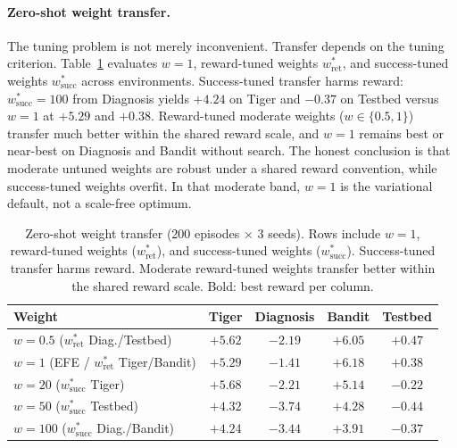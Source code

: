 \documentclass[runningheads]{llncs}
\begin{document}
\paragraph{Zero-shot weight transfer.}
The tuning problem is not merely inconvenient. Transfer depends on the tuning criterion. Table~\ref{tab:transfer} evaluates $w{=}1$, reward-tuned weights $w^*_{\mathrm{ret}}$, and success-tuned weights $w^*_{\mathrm{succ}}$ across environments. Success-tuned transfer harms reward: $w^*_{\mathrm{succ}}{=}100$ from Diagnosis yields $+4.24$ on Tiger and $-0.37$ on Testbed versus $w{=}1$ at $+5.29$ and $+0.38$. Reward-tuned moderate weights ($w\in\{0.5,1\}$) transfer much better within the shared reward scale, and $w{=}1$ remains best or near-best on Diagnosis and Bandit without search. The honest conclusion is that moderate untuned weights are robust under a shared reward convention, while success-tuned weights overfit. In that moderate band, $w{=}1$ is the variational default, not a scale-free optimum.

\begin{table}[ht]
\centering
\caption{Zero-shot weight transfer (200 episodes $\times$ 3 seeds). Rows include $w{=}1$, reward-tuned weights ($w^*_{\mathrm{ret}}$), and success-tuned weights ($w^*_{\mathrm{succ}}$). Success-tuned transfer harms reward. Moderate reward-tuned weights transfer better within the shared reward scale. Bold: best reward per column.}
\label{tab:transfer}
\begin{small}
\begin{tabular}{lcccc}
\toprule
Weight & Tiger & Diagnosis & Bandit & Testbed \\
\midrule
$w{=}0.5$ ($w^*_{\mathrm{ret}}$ Diag./Testbed) & $+5.62$ & $-2.19$ & $+6.05$ & $\mathbf{+0.47}$ \\
$w{=}1$ (EFE / $w^*_{\mathrm{ret}}$ Tiger/Bandit) & $+5.29$ & $\mathbf{-1.41}$ & $\mathbf{+6.18}$ & $+0.38$ \\
$w{=}20$ ($w^*_{\mathrm{succ}}$ Tiger) & $\mathbf{+5.68}$ & $-2.21$ & $+5.14$ & $-0.22$ \\
$w{=}50$ ($w^*_{\mathrm{succ}}$ Testbed) & $+4.32$ & $-3.74$ & $+4.28$ & $-0.44$ \\
$w{=}100$ ($w^*_{\mathrm{succ}}$ Diag./Bandit) & $+4.24$ & $-3.44$ & $+3.91$ & $-0.37$ \\
\bottomrule
\end{tabular}
\end{small}
\end{table}
\end{document}

